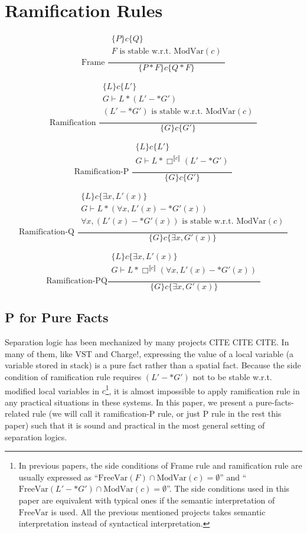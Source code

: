 \section{Ramification Rules}

\newcommand{\Rule}[3]{\[\text{#1}\frac{\begin{array}{c} #2 \end{array}}{#3}\]}
\newcommand{\MV}{\text{ModVar}}
\newcommand{\FV}{\text{FreeVar}}

\Rule{Frame  }
{\{ P \} c \{Q \} \\
  F \text{ is stable w.r.t. } \MV(c)\\}
 {\{P * F \} c \{ Q * F \}}

\Rule{Ramification   }
{\{ L \} c \{L' \} \\
 G \vdash L * (L' -* G') \\
 (L' -* G') \text{ is stable w.r.t. } \MV(c)\\}
{\{ G \} c \{ G' \}}

\Rule{Ramification-P }
{\{ L \} c \{L' \} \\
 G \vdash L * \Box^{\llbracket c \rrbracket} (L' -* G') \\}
{\{ G \} c \{ G' \}}

\Rule{Ramification-Q }
{\{ L \} c \{ \exists x, L' (x) \} \\
 G \vdash L * (\forall x, L' (x) -* G' (x)) \\
 \forall x, (L'(x) -* G'(x)) \text{ is stable w.r.t. } \MV(c)\\}
{\{ G \} c \{ \exists x, G' (x)\}}

\Rule{Ramification-PQ}
{\{ L \} c \{ \exists x, L' (x) \} \\
 G \vdash L * \Box^{\llbracket c \rrbracket} (\forall x, L' (x) -* G' (x)) \\}
{\{ G \} c \{ \exists x, G' (x)\}}

\subsection{P for Pure Facts}

Separation logic has been mechanized by many projects CITE CITE CITE.
In many of them, like VST and Charge!, expressing the value of a local
variable (a variable stored in stack) is a pure fact rather than a
spatial fact. Because the side condition of ramification rule requires $(L' -* G')$ not
to be stable w.r.t. modified local variables in $c$\footnote{In previous papers, the side conditions of Frame rule and ramification rule are usually expressed as ``$\FV(F) \cap \MV(c) = \emptyset$'' and ``$\FV(L' -* G') \cap \MV(c) = \emptyset$''. The side conditions used in this paper are equivalent with typical ones if the semantic interpretation of $\FV$ is used. All the previous mentioned projects takes semantic interpretation instead of syntactical interpretation.}, it is almost impossible to apply ramification rule in any practical situations in these systems. In this paper, we present a pure-facts-related rule (we will call it ramification-P rule, or just P rule in the rest this paper) such that it is sound and practical in the most general setting of separation logics.

